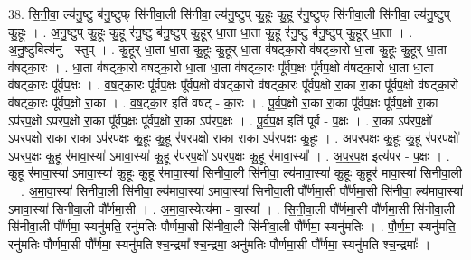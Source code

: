 \documentclass[17pt]{extarticle}
\begin{document}
38. सि॒नी॒वा॒ ल्य॑नु॒ष्टु ब॑नु॒ष्टुफ् सि॑नीवा॒ली सि॑नीवा॒ ल्य॑नु॒ष्टुप् कु॒हूः कु॒हू र॑नु॒ष्टुफ् सि॑नीवा॒ली सि॑नीवा॒
ल्य॑नु॒ष्टुप् कु॒हूः । . अ॒नु॒ष्टुप् कु॒हूः कु॒हू र॑नु॒ष्टु ब॑नु॒ष्टुप् कु॒हूर् धा॒ता धा॒ता कु॒हू र॑नु॒ष्टु ब॑नु॒ष्टुप् कु॒हूर् धा॒ता । . अ॒नु॒ष्टुबित्य॑नु - स्तुप् । . कु॒हूर् धा॒ता धा॒ता कु॒हूः कु॒हूर् धा॒ता व॑षट्का॒रो व॑षट्का॒रो धा॒ता कु॒हूः कु॒हूर् धा॒ता व॑षट्का॒रः । . धा॒ता व॑षट्का॒रो व॑षट्का॒रो धा॒ता धा॒ता व॑षट्का॒रः पू᳚र्वप॒क्षः पू᳚र्वप॒क्षो व॑षट्का॒रो धा॒ता धा॒ता व॑षट्का॒रः पू᳚र्वप॒क्षः । . व॒ष॒ट्का॒रः पू᳚र्वप॒क्षः पू᳚र्वप॒क्षो व॑षट्का॒रो व॑षट्का॒रः पू᳚र्वप॒क्षो रा॒का रा॒का 
पू᳚र्वप॒क्षो व॑षट्का॒रो व॑षट्का॒रः पू᳚र्वप॒क्षो रा॒का । . व॒ष॒ट्का॒र इति॑ वषट् - का॒रः । . पू॒र्व॒प॒क्षो रा॒का रा॒का पू᳚र्वप॒क्षः पू᳚र्वप॒क्षो रा॒का ऽप॑रप॒क्षो॑ ऽपरप॒क्षो रा॒का 
पू᳚र्वप॒क्षः पू᳚र्वप॒क्षो रा॒का ऽप॑रप॒क्षः । . पू॒र्व॒प॒क्ष इति॑ पूर्व - प॒क्षः । . रा॒का ऽप॑रप॒क्षो॑ ऽपरप॒क्षो रा॒का रा॒का ऽप॑रप॒क्षः कु॒हूः कु॒हू र॑परप॒क्षो रा॒का रा॒का ऽप॑रप॒क्षः कु॒हूः । . अ॒प॒र॒प॒क्षः कु॒हूः कु॒हू र॑परप॒क्षो॑ ऽपरप॒क्षः कु॒हू र॑मावा॒स्या॑ ऽमावा॒स्या॑ कु॒हू र॑परप॒क्षो॑ ऽपरप॒क्षः कु॒हू र॑मावा॒स्या᳚ । . अ॒प॒र॒प॒क्ष इत्य॑पर - प॒क्षः । . कु॒हू र॑मावा॒स्या॑ ऽमावा॒स्या॑ कु॒हूः कु॒हू र॑मावा॒स्या॑ सिनीवा॒ली सि॑नीवा॒ ल्य॑मावा॒स्या॑ कु॒हूः कु॒हूर॑ मावा॒स्या॑ सिनीवा॒ली । . अ॒मा॒वा॒स्या॑ सिनीवा॒ली सि॑नीवा॒ ल्य॑मावा॒स्या॑ ऽमावा॒स्या॑ सिनीवा॒ली पौ᳚र्णमा॒सी पौ᳚र्णमा॒सी सि॑नीवा॒
ल्य॑मावा॒स्या॑ ऽमावा॒स्या॑ सिनीवा॒ली पौ᳚र्णमा॒सी । . अ॒मा॒वा॒स्येत्य॑मा - वा॒स्या᳚ । . सि॒नी॒वा॒ली पौ᳚र्णमा॒सी पौ᳚र्णमा॒सी सि॑नीवा॒ली सि॑नीवा॒ली पौ᳚र्णमा॒ स्यनु॑मति॒ रनु॑मतिः पौर्णमा॒सी सि॑नीवा॒ली 
सि॑नीवा॒ली पौ᳚र्णमा॒ स्यनु॑मतिः । . पौ॒र्ण॒मा॒ स्यनु॑मति॒ रनु॑मतिः पौर्णमा॒सी पौ᳚र्णमा॒ स्यनु॑मति श्च॒न्द्रमा᳚ श्च॒न्द्रमा॒ अनु॑मतिः पौर्णमा॒सी पौ᳚र्णमा॒ स्यनु॑मति श्च॒न्द्रमाः᳚ । \newline
\end{document}
